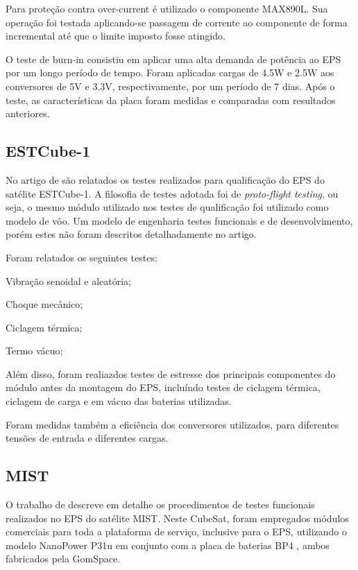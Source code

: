 Para proteção contra over-current é utilizado o componente MAX890L. Sua operação foi testada aplicando-se passagem de corrente ao componente de forma incremental até que o limite imposto fosse atingido.

O teste de burn-in consistiu em aplicar uma alta demanda de potência ao EPS por um longo período de tempo.
Foram aplicadas cargas de 4.5W e 2.5W aos conversores de 5V e 3.3V, respectivamente, por um período de 7 dias. Após o teste, as características da placa foram medidas e comparadas com resultados anteriores.

\subsection{ESTCube-1}

No artigo de \textcite{estcube-eps} são relatados os testes realizados para qualificação do \gls{EPS} do satélite ESTCube-1. A filosofia de testes adotada foi de \textit{proto-flight testing}, ou seja, o mesmo módulo utilizado nos testes de qualificação foi utilizado como modelo de vôo.
Um modelo de engenharia testes funcionais e de desenvolvimento, porém estes não foram descritos detalhadamente no artigo.

Foram relatados os seguintes testes:
\begin{alineas}
    \item Vibração senoidal e aleatória;
    \item Choque mecânico;
    \item Ciclagem térmica;
    \item Termo vácuo;
\end{alineas}

Além disso, foram realiazdos testes de estresse dos principais componentes do módulo antes da montagem do \gls{EPS}, incluíndo testes de ciclagem térmica, ciclagem de carga e em vácuo das baterias utilizadas.

Foram medidas também a eficiência dos conversores utilizados, para diferentes tensões de entrada e diferentes cargas.


\subsection{MIST}

O trabalho de \textcite{mist-eps} descreve em detalhe os procedimentos de testes funcionais realizados no \gls{EPS} do satélite MIST.
Neste CubeSat, foram empregados módulos comerciais para toda a plataforma de serviço, inclusive para o \gls{EPS}, utilizando o modelo NanoPower P31u \cite{p31u-datasheet} em conjunto com a placa de baterias BP4 \cite{bp4-datasheet}, ambos fabricados pela GomSpace.

